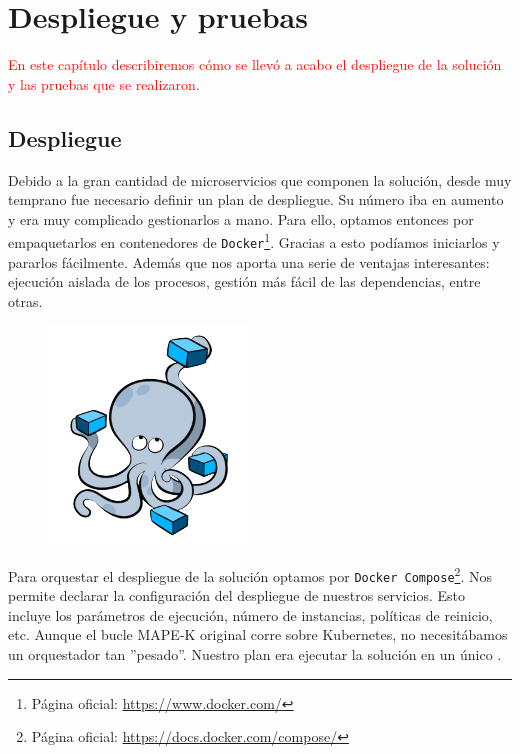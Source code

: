 \chapter{Despliegue y pruebas}
\label{chap:despliegue}

\textcolor{red}{En este capítulo describiremos cómo se llevó a acabo el despliegue de la solución y las pruebas que se realizaron.}

\section{Despliegue}

Debido a la gran cantidad de microservicios que componen la solución, desde muy temprano fue necesario definir un plan de despliegue. Su número iba en aumento y era muy complicado gestionarlos a mano. Para ello, optamos entonces por empaquetarlos en contenedores de \texttt{Docker}\footnote{Página oficial: \url{https://www.docker.com/}}. Gracias a esto podíamos iniciarlos y pararlos fácilmente. Además que nos aporta una serie de ventajas interesantes: ejecución aislada de los procesos, gestión más fácil de las dependencias, entre otras. \cite{newmanBuildingMicroservicesDesigning2021,delatorreNETMicroservicesArchitecture2021}

\begin{figure}
  \vspace{-25pt}
  \centering
  \includegraphics[scale=0.95]{cap_despliegue/images/docker-compose-logo}
  \vspace{-15pt}
\end{figure}

Para orquestar el despliegue de la solución optamos por \texttt{Docker Compose}\footnote{Página oficial: \url{https://docs.docker.com/compose/}}. Nos permite declarar la configuración del despliegue de nuestros servicios. Esto incluye los parámetros de ejecución, número de instancias, políticas de reinicio, etc. Aunque el bucle MAPE-K  original corre sobre Kubernetes, no necesitábamos un orquestador tan ''pesado''. Nuestro plan era ejecutar la solución en un único .

